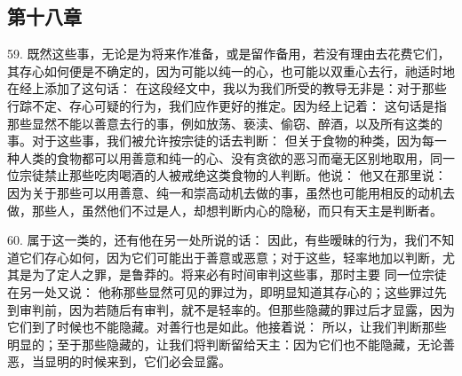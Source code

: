
\subsection{第十八章}

59. 既然这些事，无论是为将来作准备，或是留作备用，若没有理由去花费它们，其存心如何便是不确定的，因为可能以纯一的心，也可能以双重心去行，祂适时地在经上添加了这句话： 在这段经文中，我以为我们所受的教导无非是：对于那些行踪不定、存心可疑的行为，我们应作更好的推定。因为经上记着： 这句话是指那些显然不能以善意去行的事，例如放荡、亵渎、偷窃、醉酒，以及所有这类的事。对于这些事，我们被允许按宗徒的话去判断： 但关于食物的种类，因为每一种人类的食物都可以用善意和纯一的心、没有贪欲的恶习而毫无区别地取用，同一位宗徒禁止那些吃肉喝酒的人被戒绝这类食物的人判断。他说： 他又在那里说： 因为关于那些可以用善意、纯一和崇高动机去做的事，虽然也可能用相反的动机去做，那些人，虽然他们不过是人，却想判断内心的隐秘，而只有天主是判断者。\par

60. 属于这一类的，还有他在另一处所说的话： 因此，有些暧昧的行为，我们不知道它们存心如何，因为它们可能出于善意或恶意；对于这些，轻率地加以判断，尤其是为了定人之罪，是鲁莽的。将来必有时间审判这些事，那时主要 同一位宗徒在另一处又说： 他称那些显然可见的罪过为，即明显知道其存心的；这些罪过先到审判前，因为若随后有审判，就不是轻率的。但那些隐藏的罪过后才显露，因为它们到了时候也不能隐藏。对善行也是如此。他接着说： 所以，让我们判断那些明显的；至于那些隐藏的，让我们将判断留给天主：因为它们也不能隐藏，无论善恶，当显明的时候来到，它们必会显露。\par

